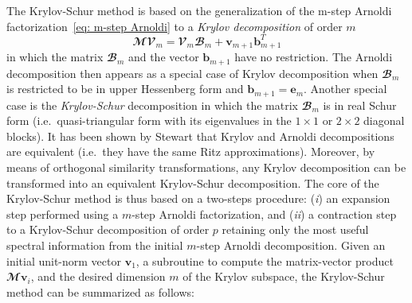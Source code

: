     The Krylov-Schur method is based on the generalization of the m-step Arnoldi factorization~\eqref{eq: m-step Arnoldi} to a \emph{Krylov decomposition} of order $m$
    \begin{equation}
      \mathbfcal{MV}_m = \mathbfcal{V}_m \mathbfcal{B}_m + \mathbf{v}_{m+1} \mathbf{b}_{m+1}^T
      \label{eq: Krylov decomposition}
    \end{equation}
    in which the matrix $\mathbfcal{B}_m$ and the vector $\mathbf{b}_{m+1}$ have no restriction. The Arnoldi decomposition then appears as a special case of Krylov decomposition when $\mathbfcal{B}_m$ is restricted to be in upper Hessenberg form and $\mathbf{b}_{m+1} = \mathbf{e}_m$. Another special case is the \emph{Krylov-Schur} decomposition in which the matrix $\mathbfcal{B}_m$ is in real Schur form (i.e.\ quasi-triangular form with its eigenvalues in the $1 \times 1$ or $2 \times 2$ diagonal blocks). It has been shown by Stewart \cite{Stewart_SIAM_2001} that Krylov and Arnoldi decompositions are equivalent (i.e.\ they have the same Ritz approximations). Moreover, by means of orthogonal similarity transformations, any Krylov decomposition can be transformed into an equivalent Krylov-Schur decomposition. The core of the Krylov-Schur method is thus based on a two-steps procedure: (\emph{i}) an expansion step performed using a $m$-step Arnoldi factorization, and (\emph{ii}) a contraction step to a Krylov-Schur decomposition of order $p$ retaining only the most useful spectral information from the initial $m$-step Arnoldi decomposition. Given an initial unit-norm vector $\mathbf{v}_1$, a subroutine to compute the matrix-vector product $\mathbfcal{M} \mathbf{v}_i$, and the desired dimension $m$ of the Krylov subspace, the Krylov-Schur method can be summarized as follows:
